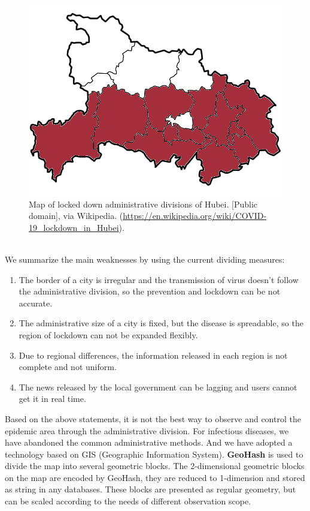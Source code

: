 \documentclass[sigplan,screen]{acmart}
\begin{document}
\begin{figure}[htb]
	\centering
	\includegraphics[width=\linewidth]{hubei.png}
	\caption{Map of locked down administrative divisions of Hubei. [Public domain], via Wikipedia. (\url{https://en.wikipedia.org/wiki/COVID-19_lockdown_in_Hubei}).}
\end{figure}
\\
We summarize the main weaknesses by using the current dividing measures:
\begin{enumerate}
	\item The border of a city is irregular and the transmission of virus doesn't follow the administrative division, so the prevention and lockdown can be not accurate.
	\item The administrative size of a city is fixed, but the disease is spreadable, so the region of lockdown can not be expanded flexibly.
	\item Due to regional differences, the information released in each region is not complete and not uniform.
	\item The news released by the local government can be lagging and users cannot get it in real time.
\end{enumerate}
Based on the above statements, it is not the best way to observe and control the epidemic area through the administrative division.
For infectious diseases, we have abandoned the common administrative methods. And we have adopted a technology based on GIS (Geographic Information System)\cite{clarke1986advances}. \textbf{GeoHash} is used to divide the map into several geometric blocks. The 2-dimensional geometric blocks on the map are encoded by GeoHash, they are reduced to 1-dimension and stored as string in any databases. These blocks are presented as regular geometry, but can be scaled according to the needs of different observation scope.
\end{document}
